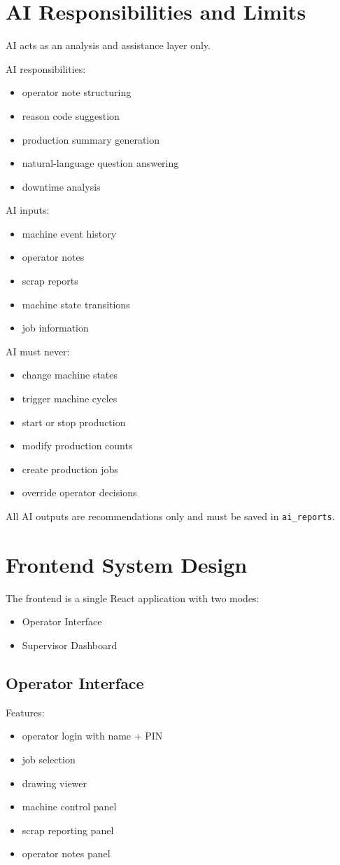 \documentclass[11pt]{article}
\begin{document}
\section{AI Responsibilities and Limits}
AI acts as an analysis and assistance layer only.

AI responsibilities:
\begin{itemize}
\item operator note structuring
\item reason code suggestion
\item production summary generation
\item natural-language question answering
\item downtime analysis
\end{itemize}

AI inputs:
\begin{itemize}
\item machine event history
\item operator notes
\item scrap reports
\item machine state transitions
\item job information
\end{itemize}

AI must never:
\begin{itemize}
\item change machine states
\item trigger machine cycles
\item start or stop production
\item modify production counts
\item create production jobs
\item override operator decisions
\end{itemize}

All AI outputs are recommendations only and must be saved in \texttt{ai\_reports}.

\section{Frontend System Design}
The frontend is a single React application with two modes:
\begin{itemize}
\item Operator Interface
\item Supervisor Dashboard
\end{itemize}

\subsection{Operator Interface}
Features:
\begin{itemize}
\item operator login with name + PIN
\item job selection
\item drawing viewer
\item machine control panel
\item scrap reporting panel
\item operator notes panel
\end{itemize}
\end{document}
